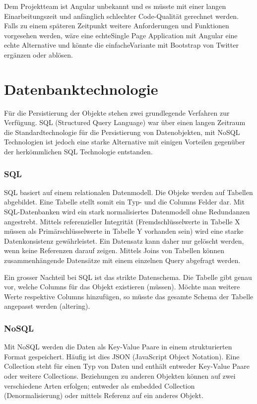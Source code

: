 Dem Projektteam ist Angular unbekannt und es müsste mit einer langen Einarbeitungszeit und anfänglich schlechter Code-Qualität gerechnet werden. Falls zu einem späteren Zeitpunkt weitere Anforderungen und Funktionen vorgesehen werden, wäre eine \glqq echte\grqq  Single Page Application mit Angular eine echte Alternative und könnte die \glqq einfache\grqq  Variante mit Bootstrap von Twitter ergänzen oder ablösen.

\newpage
\section{Datenbanktechnologie}
Für die Persistierung der Objekte stehen zwei grundlegende Verfahren zur Verfügung. SQL (Structured Query Language) war über einen langen Zeitraum die Standardtechnologie für die Persistierung von Datenobjekten, mit NoSQL Technologien ist jedoch eine starke Alternative mit einigen Vorteilen gegenüber der herkömmlichen SQL Technologie entstanden.

\subsubsection{SQL}
SQL basiert auf einem relationalen Datenmodell. Die Objeke werden auf Tabellen abgebildet. Eine Tabelle stellt somit ein Typ- und die Columns Felder dar. Mit SQL-Datenbanken wird ein stark normalisiertes Datenmodell ohne Redundanzen angestrebt. Mittels referenzieller Integrität (Fremdschlüsselwerte in Tabelle X müssen als Primärschlüsselwerte in Tabelle Y vorhanden sein) wird eine starke Datenkonsistenz gewährleistet. Ein Datensatz kann daher nur gelöscht werden, wenn keine Referenzen darauf zeigen. Mittels Joins von Tabellen können zusammenhängende Datensätze mit einem einzelnen Query abgefragt werden.

Ein grosser Nachteil bei SQL ist das strikte Datenschema. Die Tabelle gibt genau vor, welche Columns für das Objekt existieren (müssen). Möchte man weitere Werte respektive Columns hinzufügen, so müsste das gesamte Schema der Tabelle angepasst werden (altering).

\subsubsection{NoSQL}
Mit NoSQL werden die Daten als Key-Value Paare in einem strukturierten Format gespeichert. Häufig ist dies JSON (JavaScript Object Notation). Eine Collection steht für einen Typ von Daten und enthält entweder Key-Value Paare oder weitere Collections. Beziehungen zu anderen Objekten können auf zwei verschiedene Arten erfolgen; entweder als embedded Collection (Denormalisierung) oder mittels Referenz auf ein anderes Objekt.

